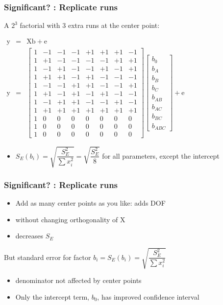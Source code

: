 \begin{frame}\frametitle{Significant? : Replicate runs}

	A $2^3$ factorial with 3 extra runs at the center point:

	$
	\begin{array}{rcl}
		\mathrm{y} &=& \mathrm{X} \mathrm{b} + \mathrm{e}\\
		\mathrm{y} &=&
		\begin{bmatrix}
			1 & -1 & -1 & -1 & +1 & +1 & +1 & -1\\
			1 & +1 & -1 & -1 & -1 & -1 & +1 & +1\\
			1 & -1 & +1 & -1 & -1 & +1 & -1 & +1\\
			1 & +1 & +1 & -1 & +1 & -1 & -1 & -1\\
			1 & -1 & -1 & +1 & +1 & -1 & -1 & +1\\
			1 & +1 & -1 & +1 & -1 & +1 & -1 & -1\\
			1 & -1 & +1 & +1 & -1 & -1 & +1 & -1\\
			1 & +1 & +1 & +1 & +1 & +1 & +1 & +1\\
			1 & 0 & 0 & 0 & 0 & 0 & 0 & 0\\
			1 & 0 & 0 & 0 & 0 & 0 & 0 & 0\\
			1 & 0 & 0 & 0 & 0 & 0 & 0 & 0
		\end{bmatrix}
		\begin{bmatrix}
			b_0 \\
			b_A \\
			b_B \\
			b_{C} \\
			b_{AB} \\
			b_{AC} \\
			b_{BC} \\
			b_{ABC}
		\end{bmatrix}
		+ \mathrm{e}
	\end{array}
	$
	\begin{itemize}
		\item	$S_E(b_i) = \sqrt{\dfrac{S_E^2}{\sum{x_i^2}}} = \sqrt{\dfrac{S_E^2}{8}} $ for all parameters, except the intercept
	\end{itemize}
\end{frame}

\begin{frame}\frametitle{Significant? : Replicate runs}
	\begin{itemize}
		\item	Add as many center points as you like: adds DOF
		\item	without changing orthogonality of $\mathrm{X}$
		\item	decreases $S_E$
	\end{itemize}

	But standard error for factor $b_i = S_E(b_i) = \sqrt{\dfrac{S_E^2}{\sum{x_i^2}}}$
	\begin{itemize}
		\item	denominator not affected by center points
		\item	Only the intercept term, $b_0$, has improved confidence interval
	\end{itemize}
\end{frame}

